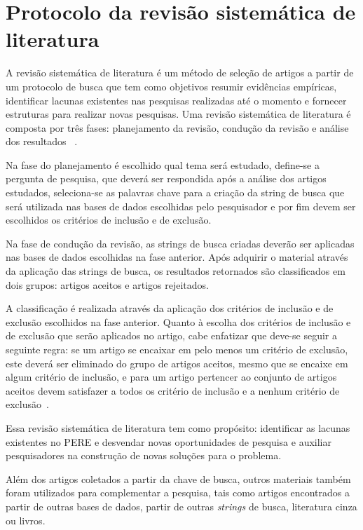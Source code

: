 { }%

\section{Protocolo da revisão sistemática de literatura}

A revisão sistemática de literatura é um método de seleção de artigos a partir de um protocolo de busca que tem como objetivos resumir evidências empíricas, identificar lacunas existentes nas pesquisas realizadas até o momento e fornecer estruturas para realizar novas pesquisas. Uma revisão sistemática de literatura é composta por três fases: planejamento da revisão, condução da revisão e análise dos resultados~ \cite{Kitchenham:2007} .

Na fase do planejamento é escolhido qual tema será estudado, define-se a pergunta de pesquisa, que deverá ser respondida após a análise dos artigos estudados, seleciona-se as palavras chave para a criação da string de busca que será utilizada nas bases de dados escolhidas pelo pesquisador e por fim devem ser escolhidos os critérios de inclusão e de exclusão.

Na fase de condução da revisão, as strings de busca criadas deverão ser aplicadas nas bases de dados escolhidas na fase anterior.
Após adquirir o material através da aplicação das strings de busca, os resultados retornados são classificados em dois grupos: artigos  aceitos e artigos rejeitados.

A classificação é realizada através da aplicação dos critérios de inclusão e de exclusão escolhidos na fase anterior.
Quanto à escolha dos critérios de inclusão e de exclusão que serão aplicados no artigo, cabe enfatizar que deve-se seguir a  seguinte regra: se um artigo se encaixar em pelo menos um critério de exclusão, este deverá ser eliminado do grupo de artigos aceitos, mesmo que se encaixe em algum critério de inclusão, e para um artigo pertencer ao conjunto de artigos aceitos devem satisfazer a todos os critério de inclusão e a nenhum critério de exclusão~\cite{Kitchenham:2007}. 

Essa revisão sistemática de literatura tem como propósito: identificar as lacunas existentes no \ac{PERE} e desvendar novas oportunidades de pesquisa e auxiliar pesquisadores na construção de novas soluções para o problema. 

Além dos artigos coletados a partir da chave de busca, outros materiais também foram utilizados para complementar a pesquisa, tais como artigos encontrados a partir de outras bases de dados, partir de outras \textit{strings} de busca, literatura cinza ou livros.

